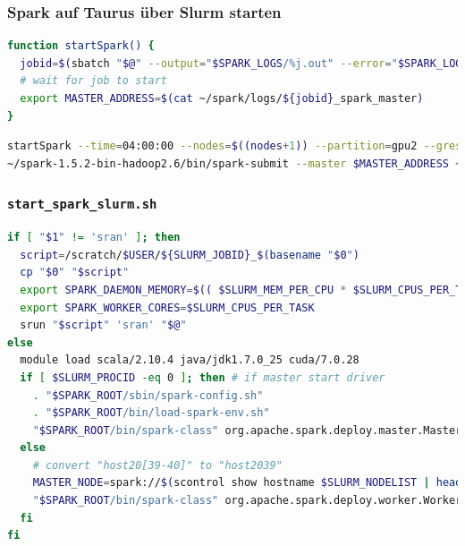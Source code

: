 

\begin{frame}[fragile]
    \frametitle{Spark auf Taurus über Slurm starten}
    \begin{lstlisting}[language=bash]
function startSpark() {
  jobid=$(sbatch "$@" --output="$SPARK_LOGS/%j.out" --error="$SPARK_LOGS/%j.err" $HOME/scaromare/start_spark_slurm.sh)
  # wait for job to start
  export MASTER_ADDRESS=$(cat ~/spark/logs/${jobid}_spark_master)
}
\end{lstlisting}\vspace{-1.5\baselineskip}
\begin{lstlisting}[language=bash]
startSpark --time=04:00:00 --nodes=$((nodes+1)) --partition=gpu2 --gres=gpu:$gpusPerNode --cpus-per-task=$coresPerNode
~/spark-1.5.2-bin-hadoop2.6/bin/spark-submit --master $MASTER_ADDRESS ~/scaromare/MontePi/multiNode/multiGpu/scala/MontePi.jar $arguments
\end{lstlisting}
\end{frame}

\begin{frame}[fragile]
    \frametitle{\lstinline!start_spark_slurm.sh!}
    \begin{lstlisting}[language=bash,xleftmargin=0pt,linewidth=1.05\linewidth,basicstyle=\scriptsize]
if [ "$1" != 'sran' ]; then
  script=/scratch/$USER/${SLURM_JOBID}_$(basename "$0")
  cp "$0" "$script"
  export SPARK_DAEMON_MEMORY=$(( $SLURM_MEM_PER_CPU * $SLURM_CPUS_PER_TASK / 2 ))m
  export SPARK_WORKER_CORES=$SLURM_CPUS_PER_TASK
  srun "$script" 'sran' "$@"
else
  module load scala/2.10.4 java/jdk1.7.0_25 cuda/7.0.28
  if [ $SLURM_PROCID -eq 0 ]; then # if master start driver
    . "$SPARK_ROOT/sbin/spark-config.sh"
    . "$SPARK_ROOT/bin/load-spark-env.sh"
    "$SPARK_ROOT/bin/spark-class" org.apache.spark.deploy.master.Master --ip $(hostname) --port $SPARK_MASTER_PORT --webui-port $SPARK_MASTER_WEBUI_PORT
  else
    # convert "host20[39-40]" to "host2039"
    MASTER_NODE=spark://$(scontrol show hostname $SLURM_NODELIST | head -n 1):7077
    "$SPARK_ROOT/bin/spark-class" org.apache.spark.deploy.worker.Worker $MASTER_NODE
  fi
fi
\end{lstlisting}
\end{frame}

